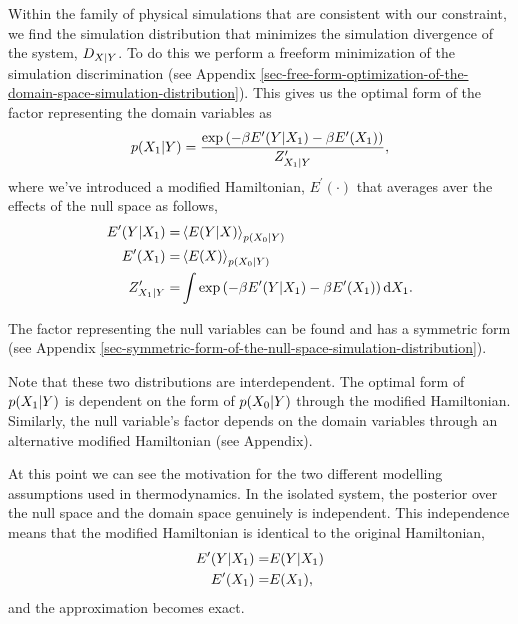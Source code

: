 \documentclass[]{article}
\begin{document}
Within the family of physical simulations that are consistent with our constraint, we find the simulation distribution  that minimizes the simulation divergence of the system, \(D_{X|Y}\). To do this we perform a freeform minimization of the simulation discrimination (see Appendix \ref{sec-free-form-optimization-of-the-domain-space-simulation-distribution}). This gives us the optimal form of the factor representing the domain variables as
\[
p(X_1|Y) = \frac{\exp\left(-\beta E^\prime(Y |X_1) - \beta E^\prime(X_1)\right)}{Z^\prime_{X_1 | Y}}, 
\] 
where we've introduced a modified Hamiltonian, $E^\prime (\cdot)$ that averages aver the effects of the null space as follows,
\begin{align*}
E^\prime(Y |X_1) = & \left\langle E(Y |X) \right\rangle_{p(X_0|Y)} \\
E^\prime(X_1) = & \left\langle E(X) \right\rangle_{p(X_0|Y)} \\
Z^\prime_{X_1 | Y} = & \int \exp\left(-\beta E^\prime(Y |X_1) - \beta E^\prime(X_1)\right) \text{d}X_1. 
\end{align*}

The factor representing the null variables can be found and has a symmetric form (see Appendix \ref{sec-symmetric-form-of-the-null-space-simulation-distribution}).

Note that these two distributions are interdependent. The optimal
form of \(p(X_1|Y)\) is dependent on
the form of \(p(X_0|Y)\) through the modified Hamiltonian. Similarly, the null variable's factor depends on the domain variables through an alternative modified Hamiltonian (see Appendix).

At this point we can see the motivation for the two different modelling assumptions used in thermodynamics. In the isolated system, the posterior over the null space and the domain space genuinely is independent. This independence means that the modified Hamiltonian is identical to the original Hamiltonian,
%
\begin{align*}
E^\prime(Y |X_1) = & E(Y |X_1) \\
E^\prime(X_1) = & E(X_1),
\end{align*}
%
and the approximation becomes exact.
\end{document}

